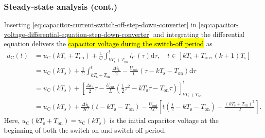 \begin{frame}
    \frametitle{Steady-state analysis (cont.)}
    Inserting \eqref{eq:capacitor-current-switch-off-step-down-converter} in \eqref{eq:capacitor-voltage-differential-equation-step-down-converter} and integrating the differential equation delivers the \hl{capacitor voltage during the switch-off period} as
    \begin{equation}
        \begin{split}
            u_\mathrm{C}(t) &= u_\mathrm{C}(k T_\mathrm{s}+T_\mathrm{on}) + \frac{1}{C}\int_{k T_\mathrm{s}+T_\mathrm{on}}^t i_\mathrm{C}(\tau) \mathrm{d}\tau, \quad t\in [k T_\mathrm{s} + T_\mathrm{on}, (k+1) T_\mathrm{s}] \\
            &= u_\mathrm{C}(k T_\mathrm{s}) + \frac{1}{C}\int_{k T_\mathrm{s}+T_\mathrm{on}}^t \frac{\Delta i_\mathrm{L}}{2} - \frac{U_\mathrm{out}}{L} (\tau - k T_\mathrm{s} - T_\mathrm{on}) \mathrm{d}\tau\\
            & = u_\mathrm{C}(k T_\mathrm{s}) + \left[\frac{\Delta i_\mathrm{L}}{2}\tau - \frac{U_\mathrm{out}}{L} (\frac{1}{2}\tau^2 - k T_\mathrm{s}\tau - T_\mathrm{on}\tau) \right]_{k T_\mathrm{s}+T_\mathrm{on}}^t\\
            &= u_\mathrm{C}(k T_\mathrm{s}) + \frac{\Delta i_\mathrm{L}}{2 C}(t - k T_\mathrm{s} - T_\mathrm{on}) - \frac{U_\mathrm{out}}{LC} \left[t(\frac{t}{2} - k T_\mathrm{s} - T_\mathrm{on}) + \frac{(k T_\mathrm{s} + T_\mathrm{on})^2}{2}\right].
        \end{split}
        \label{eq:capacitor-voltage-switch-off-step-down-converter}
    \end{equation}
    Here, $u_\mathrm{C}(k T_\mathrm{s}+T_\mathrm{on})=u_\mathrm{C}(k T_\mathrm{s})$ is the initial capacitor voltage at the beginning of both the switch-on and switch-off period.
\end{frame}

